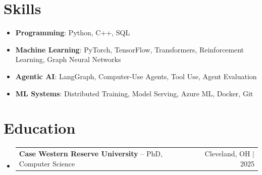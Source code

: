 \documentclass[letterpaper,13pt]{article}
\makeatletter
\newcommand{\resumeProjectHeading}[2]{
    \item
    \begin{tabular*}{\textwidth}{l@{\extracolsep{\fill}}r}
      \small#1 & #2 \\
    \end{tabular*}\vspace{-4pt}
}
\newcommand{\resumeSubHeadingListStart}{\begin{itemize}[leftmargin=0in, label={}]}
\newcommand{\resumeSubHeadingListEnd}{\end{itemize}}
\makeatother
\begin{document}
\section{Skills}
\vspace{0.02cm}
\begin{itemize}[leftmargin=0.15in, label={}, itemsep=2pt, topsep=1pt]
  \item \textbf{Programming}: Python, C++, SQL
  \item \textbf{Machine Learning}: PyTorch, TensorFlow, Transformers, Reinforcement Learning, Graph Neural Networks
  \item \textbf{Agentic AI}: LangGraph, Computer-Use Agents, Tool Use, Agent Evaluation
  \item \textbf{ML Systems}: Distributed Training, Model Serving, Azure ML, Docker, Git
\end{itemize}
\vspace{0.02cm}

\section{Education}
\resumeSubHeadingListStart
  \resumeProjectHeading{\textbf{Case Western Reserve University} -- PhD, Computer Science}{Cleveland, OH $|$ 2025}
\resumeSubHeadingListEnd
\end{document}

